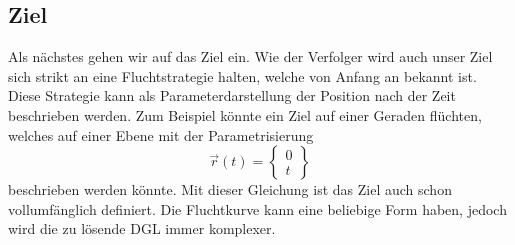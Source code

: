 \subsection{Ziel
\label{lambertw:subsection:Ziel}}
Als nächstes gehen wir auf das Ziel ein.
Wie der Verfolger wird auch unser Ziel sich strikt an eine Fluchtstrategie halten, welche von Anfang an bekannt ist.
Diese Strategie kann als Parameterdarstellung der Position nach der Zeit beschrieben werden.
Zum Beispiel könnte ein Ziel auf einer Geraden flüchten, welches auf einer Ebene mit der Parametrisierung
\begin{equation}
    \vec{r}(t)
    =
    \begin{Bmatrix}
        0\\
        t
    \end{Bmatrix}
\end{equation}
beschrieben werden könnte.
Mit dieser Gleichung ist das Ziel auch schon vollumfänglich definiert.
Die Fluchtkurve kann eine beliebige Form haben, jedoch wird die zu lösende DGL immer komplexer.




